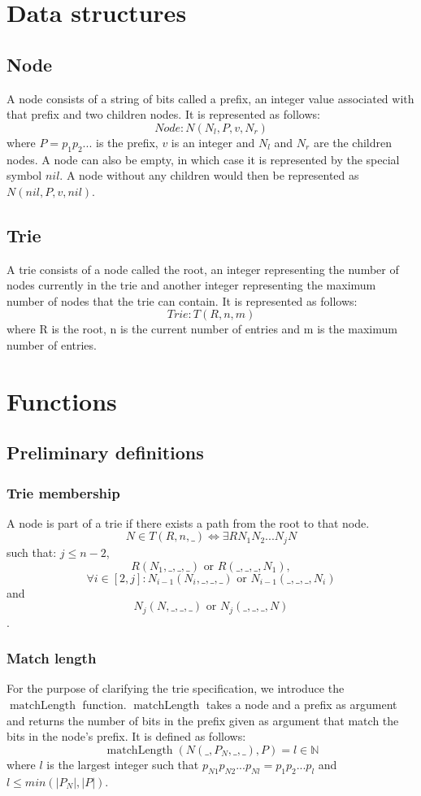 \documentclass{article}
\DeclareMathOperator{\matchlength}{matchLength}
\begin{document}
\section{Data structures}
\subsection{Node}
A node consists of a string of bits called a prefix, an integer value
associated with that prefix and two children nodes. It is represented
as follows:
\[
    Node: N(N_l, P, v, N_r)
\]
where $P = p_1p_2...$ is the prefix, $v$ is an integer and $N_l$ and $N_r$ are the
children nodes. A node can also be empty, in which case it is represented by the
special symbol $nil$. A node without any children would then be represented as
$N(nil, P, v, nil)$.
\subsection{Trie}
A trie consists of a node called the root, an integer representing the
number of nodes currently in the trie and another integer representing the
maximum number of nodes that the trie can contain. It is represented as follows:
\[
    Trie: T(R, n, m)
\]
where R is the root, n is the current number of entries and m is the maximum
number of entries.
\section{Functions}
\subsection{Preliminary definitions}
\subsubsection{Trie membership}
A node is part of a trie if there exists a path from the root to that node.
\[
    N \in T(R, n, \_) \Leftrightarrow \exists RN_1N_2...N_jN
\]
such that: $j \leq n-2$,
\[
    R(N_1, \_, \_, \_) \text{ or } R(\_, \_, \_, N_1),
\]
\[
    \forall i \in [2, j]: N_{i-1}(N_i, \_, \_, \_) \text{ or } N_{i-1}(\_, \_, \_, N_i)
\]
and
\[
    N_j(N, \_, \_, \_) \text{ or } N_j(\_, \_, \_, N)
\].
\subsubsection{Match length}
For the purpose of clarifying the trie specification, we introduce the
$\matchlength$ function. $\matchlength$ takes a node and a prefix as argument and
returns the number of bits in the prefix given as argument that match the
bits in the node's prefix. It is defined as follows:
\[
    \matchlength(N(\_, P_N, \_, \_), P) = l \in \mathbb{N}
\]
where $l$ is the largest integer such that $p_{N1}p_{N2}...p_{Nl} = p_1p_2...p_l$
and $l \leq min(|P_N|, |P|)$.
\end{document}
